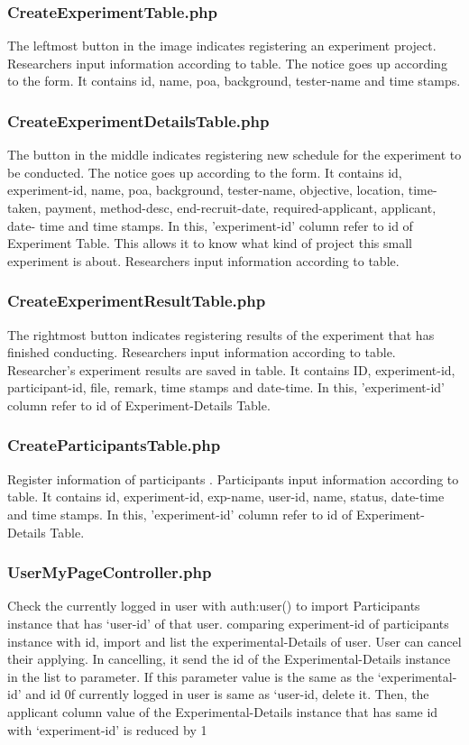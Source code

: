\documentclass[letterpaper, 10 pt, conference]{ieeeconf}  %
\begin{document}
\subsubsection{CreateExperimentTable.php}
The leftmost button in the image indicates registering an experiment project. Researchers input information according to table. The notice goes up according to the  form. It  contains  id, name, poa, background, tester-name and time stamps.\\
\subsubsection{CreateExperimentDetailsTable.php}
The button in the middle indicates registering new schedule for the experiment to be conducted. The notice goes up according to the  form.  It  contains  id,  experiment-id,  name,  poa,  background,  tester-name,  objective,  location,  time-taken,  payment, method-desc,  end-recruit-date,  required-applicant,  applicant,  date- time and time stamps. In this, 'experiment-id' column refer to id of Experiment Table. This allows it to know what kind of project this small experiment is about. Researchers input information according to table.\\
\subsubsection{CreateExperimentResultTable.php}
The rightmost button indicates registering results of the experiment that has finished conducting. Researchers input information  according  to  table.  Researcher’s  experiment  results are saved in table. It contains ID, experiment-id, participant-id, file, remark, time stamps and date-time. In this, 'experiment-id' column refer to id of Experiment-Details Table.\\
\subsubsection{CreateParticipantsTable.php}
Register information of participants . Participants  input  information according  to  table.  It  contains  id,  experiment-id,  exp-name, user-id, name,  status,  date-time and time stamps. In this, 'experiment-id' column refer to id of Experiment-Details Table.\\
\subsubsection{UserMyPageController.php}
Check the currently logged in user with auth:user() to import Participants instance that has ‘user-id’ of that user. comparing experiment-id of participants instance with id, import and list the experimental-Details of user. User can cancel their applying. In cancelling, it send the id of the Experimental-Details instance in the list to parameter. If this parameter value is the same as the ‘experimental-id’ and id 0f currently logged in user is same as ‘user-id, delete it. Then, the applicant column value of the Experimental-Details instance that has same id with ‘experiment-id’ is reduced by 1\\
\end{document}
